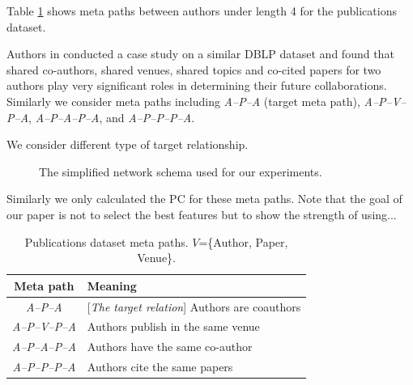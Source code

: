 Table \ref{table_publications} shows meta paths between authors under length 4 for the publications dataset.

Authors in \cite{sun2011ASONAM} conducted a case study on a similar DBLP dataset and found that shared co-authors, shared venues, shared topics and co-cited papers for two authors play very significant roles in determining their future collaborations. Similarly we consider meta paths including \textit{A--P--A} (target meta path), \textit{A--P--V--P--A}, \textit{A--P--A--P--A}, and \textit{A--P--P--P--A}.

We consider different type of target relationship.


\begin{figure}[t]
\centering
{}
\caption{The simplified network schema used for our experiments.} \label{Fig:expSchema}
\end{figure}


Similarly we only calculated the PC for these meta paths. Note that the goal of our paper is not to select the best features but to show the strength of using...


\begin{table}[h]
\centering
\caption{Publications dataset meta paths. $V$=\{Author, Paper, Venue\}.}
\label{table_publications}\scriptsize
\begin{tabular}{|c|l|} \hline
\textbf{Meta path} & \textbf{Meaning} \\ \hline

\textit{A--P--A} & [\textit{The target relation}] Authors are coauthors \\ \hline
\textit{A--P--V--P--A} & Authors publish in the same venue \\ \hline
\textit{A--P--A--P--A} & Authors have the same co-author \\ \hline
\textit{A--P--P--P--A} & Authors cite the same papers \\ \hline

\end{tabular}


\end{table}

